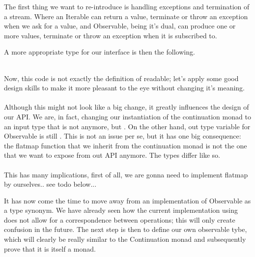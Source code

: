 The first thing we want to re-introduce is handling exceptions and termination of a stream. Where an Iterable can return a value, terminate or throw an exception when we ask for a value, and Observable, being it's dual, can produce one or more values, terminate or throw an exception when it is subscribed to. 

A more appropriate type for our interface is then the following.\\

\\


Now, this code is not exactly the definition of readable; let's apply some good design skills to make it more pleasant to the eye without changing it's meaning.\\

\\

Although this might not look like a big change, it greatly influences the design of our API. We are, in fact, changing our instantiation of the continuation monad to an input type that is not  anymore, but . On the other hand, out type variable for Observable is still . This is not an issue per se, but it has one big consequence: the flatmap function that we inherit from the continuation monad is not the one that we want to expose from out API anymore. The types differ like so.\\

\\

This has many implications, first of all, we are gonna need to implement flatmap by ourselves.. see todo below...

It has now come the time to move away from an implementation of Observable as a type synonym. We have already seen how the current implementation using  does not allow for a correspondence between \code{>>=} operations; this will only create confusion in the future. The next step is then to define our own observable tybe, which will clearly be really similar to the Continuation monad and subsequently prove that it is itself a monad. 

